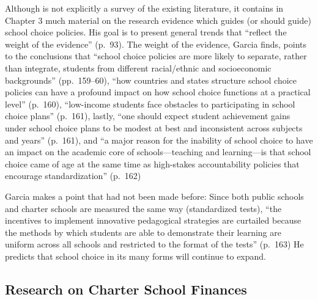 Although \textcite{Garcia2018} is not explicitly a survey of the existing literature, it contains in Chapter 3 
much material on the research evidence which guides (or should guide) school choice policies. His goal is to present general trends that ``reflect the weight of the evidence'' (p.~93). The weight of the evidence, Garcia finds, points to the conclusions that ``school choice policies are more likely to separate, rather than integrate, students from different racial/ethnic and socioeconomic backgrounds'' (pp.~159–60), ``how countries and states structure school choice policies can have a profound impact on how school choice functions at a practical level'' (p.~160), ``low-income students face obstacles to participating in school choice plans'' (p.~161), lastly, ``one should expect student achievement gains under school choice plans to be modest at best and inconsistent across subjects and years'' (p.~161), and ``a major reason for the inability of school
choice to have an impact on the academic core of schools—teaching and learning—is that school choice came of age
at the same time as high-stakes accountability policies that encourage standardization'' (p.~162)

Garcia makes a point that had not been made before: Since both public schools and charter schools are measured the same way (standardized tests), ``the incentives to implement innovative pedagogical strategies are curtailed because the methods by which students are able to demonstrate their learning are uniform across all schools and restricted to the format of the tests'' (p.~163) He predicts that school choice in its many forms will continue to expand. %

\subsection{Research on Charter School Finances}\label{sec:rese-chart-scho}\indent


